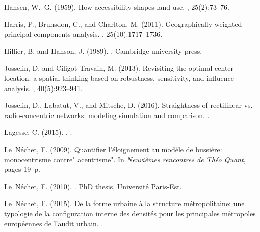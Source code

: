 \documentclass[11pt]{article}
\begin{document}
\begin{thebibliography}{}
Hansen, W.~G. (1959).
\newblock How accessibility shapes land use.
, 25(2):73--76.

Harris, P., Brunsdon, C., and Charlton, M. (2011).
\newblock Geographically weighted principal components analysis.
,
  25(10):1717--1736.

Hillier, B. and Hanson, J. (1989).
.
\newblock Cambridge university press.

Josselin, D. and Ciligot-Travain, M. (2013).
\newblock Revisiting the optimal center location. a spatial thinking based on
  robustness, sensitivity, and influence analysis.
,
  40(5):923--941.

Josselin, D., Labatut, V., and Mitsche, D. (2016).
\newblock Straightness of rectilinear vs. radio-concentric networks: modeling
  simulation and comparison.
.

{Lagesse}, C. (2015).
.
.

Le~N{\'e}chet, F. (2009).
\newblock Quantifier l'{\'e}loignement au mod{\`e}le de bussi{\`e}re:
  monocentrisme contre" acentrisme".
\newblock In {\em Neuvi{\`e}mes rencontres de Th{\'e}o Quant}, pages 19--p.

Le~N{\'e}chet, F. (2010).
.
\newblock PhD thesis, Universit{\'e} Paris-Est.

Le~N{\'e}chet, F. (2015).
\newblock De la forme urbaine {\`a} la structure m{\'e}tropolitaine: une
  typologie de la configuration interne des densit{\'e}s pour les principales
  m{\'e}tropoles europ{\'e}ennes de l'audit urbain.
.


\end{thebibliography}
\end{document}

